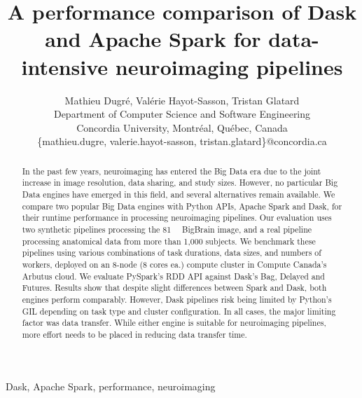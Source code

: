 \documentclass[conference]{IEEEtran}
\begin{document}
\title{A performance comparison of Dask and Apache Spark for data-intensive neuroimaging pipelines}

\author{Mathieu Dugr\'e, Val\'erie Hayot-Sasson, Tristan Glatard\\
Department of Computer Science and Software Engineering\\
Concordia University, Montr\'eal, Qu\'ebec, Canada\\
\{mathieu.dugre, valerie.hayot-sasson, tristan.glatard\}@concordia.ca
\vspace*{0.8cm} %
}

\maketitle

\begin{abstract}

In the past few years, neuroimaging has entered the Big Data era due to the joint
increase in image resolution, data sharing, and study sizes. However, no particular
Big Data engines have emerged in this field, and several alternatives remain
available. We compare two popular Big Data engines with Python APIs, Apache Spark and
Dask, for their runtime performance in processing neuroimaging pipelines. Our
evaluation uses two synthetic pipelines processing the \SI{81}{\giga\byte} BigBrain
image, and a real pipeline processing anatomical data from more than 1,000 subjects.
We benchmark these pipelines using various combinations of task durations, data
sizes, and numbers of workers, deployed on an 8-node (8 cores ea.) compute cluster in
Compute Canada's Arbutus cloud. We evaluate PySpark's RDD API against Dask's Bag,
Delayed and Futures. Results show that despite slight differences between Spark and
Dask, both engines perform comparably. However, Dask pipelines risk being limited
by Python's GIL depending on task type and cluster configuration. In all cases, the
major limiting factor was data transfer. While either engine is suitable for
neuroimaging pipelines, more effort needs to be placed in reducing data transfer time.
\end{abstract}

\begin{IEEEkeywords}
Dask, Apache Spark, performance, neuroimaging
\end{IEEEkeywords}
\end{document}
